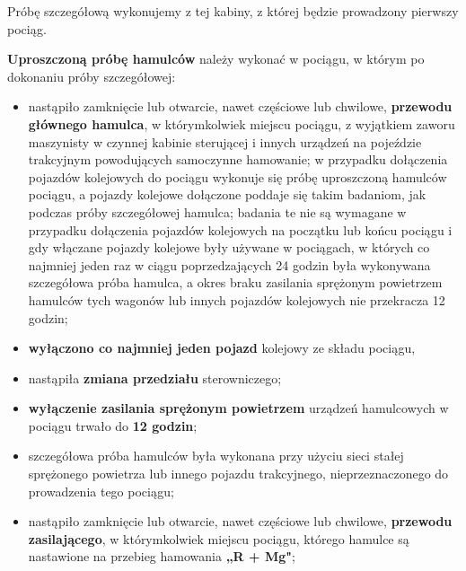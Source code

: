 \begin{itemize}
Próbę szczegółową wykonujemy z tej kabiny, z której będzie prowadzony pierwszy pociąg.	
\end{itemize}
\textbf{Uproszczoną próbę hamulców} należy wykonać w pociągu, w którym po dokonaniu próby szczegółowej:
\begin{itemize}
	\item nastąpiło zamknięcie lub otwarcie, nawet częściowe lub chwilowe, \textbf{przewodu głównego hamulca}, w którymkolwiek miejscu pociągu, z wyjątkiem zaworu maszynisty w czynnej kabinie sterującej i innych urządzeń na pojeździe trakcyjnym powodujących samoczynne hamowanie; w przypadku dołączenia pojazdów kolejowych do pociągu wykonuje się próbę uproszczoną hamulców pociągu, a pojazdy kolejowe dołączone poddaje się takim badaniom, jak podczas próby szczegółowej hamulca; badania te nie są wymagane w przypadku dołączenia pojazdów kolejowych na początku lub końcu pociągu i gdy włączane pojazdy kolejowe były używane w pociągach, w których co najmniej jeden raz w ciągu poprzedzających 24 godzin była wykonywana szczegółowa próba hamulca, a okres braku zasilania sprężonym powietrzem hamulców tych wagonów lub innych pojazdów kolejowych nie przekracza 12 godzin; 
	\item \textbf{wyłączono co najmniej jeden pojazd} kolejowy ze składu pociągu, 
	\item nastąpiła \textbf{zmiana przedziału} sterowniczego; 
	\item \textbf{wyłączenie zasilania sprężonym powietrzem} urządzeń hamulcowych w pociągu trwało do \textbf{12 godzin}; 
	\item szczegółowa próba hamulców była wykonana przy użyciu sieci stałej sprężonego powietrza lub innego pojazdu trakcyjnego, nieprzeznaczonego do prowadzenia tego pociągu; 
	\item nastąpiło zamknięcie lub otwarcie, nawet częściowe lub chwilowe, \textbf{przewodu zasilającego}, w którymkolwiek miejscu pociągu, którego hamulce są nastawione na przebieg hamowania \textbf{„R + Mg"};
\end{itemize}



